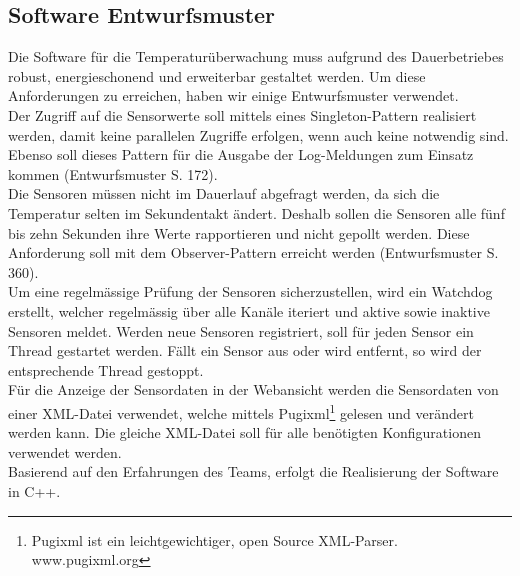 \subsection{Software Entwurfsmuster}
Die Software für die Temperaturüberwachung muss aufgrund des Dauerbetriebes robust, energieschonend und erweiterbar gestaltet werden. Um diese Anforderungen zu erreichen, haben wir einige Entwurfsmuster verwendet.\\
Der Zugriff auf die Sensorwerte soll mittels eines Singleton-Pattern realisiert werden, damit keine parallelen Zugriffe erfolgen, wenn auch keine notwendig sind. Ebenso soll dieses Pattern für die Ausgabe der Log-Meldungen zum Einsatz kommen (Entwurfsmuster S. 172).\\
Die Sensoren müssen nicht im Dauerlauf abgefragt werden, da sich die Temperatur selten im Sekundentakt ändert. Deshalb sollen die Sensoren alle fünf bis zehn Sekunden ihre Werte rapportieren und nicht gepollt werden. Diese Anforderung soll mit dem Observer-Pattern erreicht werden (Entwurfsmuster S. 360).\\
Um eine regelmässige Prüfung der Sensoren sicherzustellen, wird ein Watchdog erstellt, welcher regelmässig über alle Kanäle iteriert und aktive sowie inaktive Sensoren meldet. Werden neue Sensoren registriert, soll für jeden Sensor ein Thread gestartet werden. Fällt ein Sensor aus oder wird entfernt, so wird der entsprechende Thread gestoppt.\\
Für die Anzeige der Sensordaten in der Webansicht werden die Sensordaten von einer XML-Datei verwendet, welche mittels Pugixml\footnote{Pugixml ist ein leichtgewichtiger, open Source XML-Parser. www.pugixml.org} gelesen und verändert werden kann. Die gleiche XML-Datei soll für alle benötigten Konfigurationen verwendet werden.\\
Basierend auf den Erfahrungen des Teams, erfolgt die Realisierung der Software in C++.